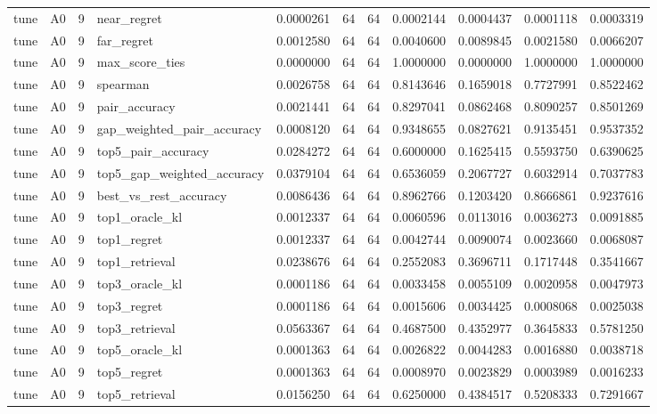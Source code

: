 \begin{tabular}{llrlrrrrrrr}
tune & A0 & 9 & near_regret & 0.0000261 & 64 & 64 & 0.0002144 & 0.0004437 & 0.0001118 & 0.0003319 \\
tune & A0 & 9 & far_regret & 0.0012580 & 64 & 64 & 0.0040600 & 0.0089845 & 0.0021580 & 0.0066207 \\
tune & A0 & 9 & max_score_ties & 0.0000000 & 64 & 64 & 1.0000000 & 0.0000000 & 1.0000000 & 1.0000000 \\
tune & A0 & 9 & spearman & 0.0026758 & 64 & 64 & 0.8143646 & 0.1659018 & 0.7727991 & 0.8522462 \\
tune & A0 & 9 & pair_accuracy & 0.0021441 & 64 & 64 & 0.8297041 & 0.0862468 & 0.8090257 & 0.8501269 \\
tune & A0 & 9 & gap_weighted_pair_accuracy & 0.0008120 & 64 & 64 & 0.9348655 & 0.0827621 & 0.9135451 & 0.9537352 \\
tune & A0 & 9 & top5_pair_accuracy & 0.0284272 & 64 & 64 & 0.6000000 & 0.1625415 & 0.5593750 & 0.6390625 \\
tune & A0 & 9 & top5_gap_weighted_accuracy & 0.0379104 & 64 & 64 & 0.6536059 & 0.2067727 & 0.6032914 & 0.7037783 \\
tune & A0 & 9 & best_vs_rest_accuracy & 0.0086436 & 64 & 64 & 0.8962766 & 0.1203420 & 0.8666861 & 0.9237616 \\
tune & A0 & 9 & top1_oracle_kl & 0.0012337 & 64 & 64 & 0.0060596 & 0.0113016 & 0.0036273 & 0.0091885 \\
tune & A0 & 9 & top1_regret & 0.0012337 & 64 & 64 & 0.0042744 & 0.0090074 & 0.0023660 & 0.0068087 \\
tune & A0 & 9 & top1_retrieval & 0.0238676 & 64 & 64 & 0.2552083 & 0.3696711 & 0.1717448 & 0.3541667 \\
tune & A0 & 9 & top3_oracle_kl & 0.0001186 & 64 & 64 & 0.0033458 & 0.0055109 & 0.0020958 & 0.0047973 \\
tune & A0 & 9 & top3_regret & 0.0001186 & 64 & 64 & 0.0015606 & 0.0034425 & 0.0008068 & 0.0025038 \\
tune & A0 & 9 & top3_retrieval & 0.0563367 & 64 & 64 & 0.4687500 & 0.4352977 & 0.3645833 & 0.5781250 \\
tune & A0 & 9 & top5_oracle_kl & 0.0001363 & 64 & 64 & 0.0026822 & 0.0044283 & 0.0016880 & 0.0038718 \\
tune & A0 & 9 & top5_regret & 0.0001363 & 64 & 64 & 0.0008970 & 0.0023829 & 0.0003989 & 0.0016233 \\
tune & A0 & 9 & top5_retrieval & 0.0156250 & 64 & 64 & 0.6250000 & 0.4384517 & 0.5208333 & 0.7291667 \\

\end{tabular}
